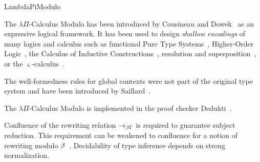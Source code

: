\begin{entry}{LambdaPiModulo}
\begin{history}
	The $\lambda\Pi$-Calculus Modulo has been introduced by Cousineau and Dowek~\cite{DBLP:conf/tlca/CousineauD07} as an expressive logical framework.
	It has been used to design \emph{shallow encodings} of many logics and calculus such as
	functional Pure Type Systems~\cite{DBLP:conf/tlca/CousineauD07},
	Higher-Order Logic~\cite{AliHOL},
	the Calculus of Inductive Constructions~\cite{Coqine},
	resolution and superposition~\cite{Resolution},
	or the $\varsigma$-calculus~\cite{RaphaelSigma}.

	The well-formedness rules for global contexts were not part of the original type system and have been introduced
	by Saillard~\cite{ModuloBeta}.

	The $\lambda\Pi$-Calculus Modulo is implemented in the proof checker Dedukti~\cite{Dedukti}.
\end{history}

\begin{technicalities}
	Confluence of the rewriting relation $\rightarrow_{\beta\Gamma}$ is required to guarantee subject reduction.
	This requirement can be weakened to confluence for a notion of rewriting modulo $\beta$~\cite{ModuloBeta}.
	Decidability of type inference depends on strong normalization.
\end{technicalities}



%
%
%
%
%
%
%
%






\end{entry}
